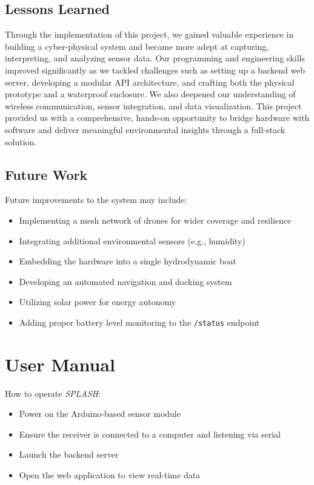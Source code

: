 \documentclass{article}
\begin{document}
    \subsection{Lessons Learned}
    Through the implementation of this project, we gained valuable experience in building a cyber-physical system and became more adept at capturing, interpreting, and analyzing sensor data. Our programming and engineering skills improved significantly as we tackled challenges such as setting up a backend web server, developing a modular API architecture, and crafting both the physical prototype and a waterproof enclosure. We also deepened our understanding of wireless communication, sensor integration, and data visualization. This project provided us with a comprehensive, hands-on opportunity to bridge hardware with software and deliver meaningful environmental insights through a full-stack solution.
    \subsection{Future Work}
    Future improvements to the system may include:
    \begin{itemize}
        \item Implementing a mesh network of drones for wider coverage and resilience
        \item Integrating additional environmental sensors (e.g., humidity)
        \item Embedding the hardware into a single hydrodynamic boat
        \item Developing an automated navigation and docking system
        \item Utilizing solar power for energy autonomy
        \item Adding proper battery level monitoring to the \texttt{/status} endpoint
    \end{itemize}

\newpage
\appendix
\section{User Manual}
How to operate \textit{SPLASH}:
\begin{itemize}
    \item Power on the Arduino-based sensor module
    \item Ensure the receiver is connected to a computer and listening via serial
    \item Launch the backend server
    \item Open the web application to view real-time data
\end{itemize}
\end{document}
